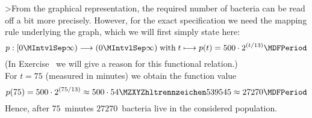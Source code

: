 \begin{MIntro}
\begin{MExample}
\begin{center}
\end{center}

>From the graphical representation, the required number of bacteria can be read off a bit more precisely. However, 
for the exact specification we need the mapping rule underlying the graph, which we will first simply state here:
$$p: [0\MIntvlSep \infty) \longrightarrow (0\MIntvlSep  \infty) \;\text{with}\; t \longmapsto p(t) = 500 \cdot 2^{(t/13)} \MDFPeriod$$
(In Exercise~ we will give a reason for this functional relation.)\\
For $t = 75$ (measured in minutes) we obtain the function value
$$p(75) = 500 \cdot 2^{(75/13)} \approx 500 \cdot \MZahl{54}{539545} \approx 27270 \MDFPeriod$$
Hence, after $75$~minutes $27270$~bacteria live in the considered population.
\end{MExample}
\end{MIntro}


